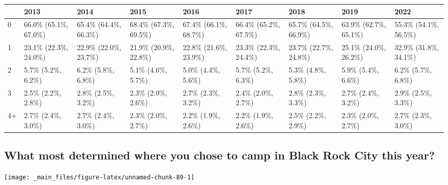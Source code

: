 \documentclass[
]{book}
\begin{document}
\begin{table}
\centering
\begin{tabular}[t]{>{}l|>{}l|>{}l|>{}l|>{}l|>{}l|>{}l|>{}l|>{}l}
\hline
  & 2013 & 2014 & 2015 & 2016 & 2017 & 2018 & 2019 & 2022\\
\hline
0 & 66.0\% (65.1\%, 67.0\%) & 65.4\% (64.4\%, 66.3\%) & 68.4\% (67.3\%, 69.5\%) & 67.4\% (66.1\%, 68.7\%) & 66.4\% (65.2\%, 67.5\%) & 65.7\% (64.5\%, 66.9\%) & 63.9\% (62.7\%, 65.1\%) & 55.3\% (54.1\%, 56.5\%)\\
\hline
1 & 23.1\% (22.3\%, 24.0\%) & 22.9\% (22.0\%, 23.7\%) & 21.9\% (20.9\%, 22.8\%) & 22.8\% (21.6\%, 23.9\%) & 23.3\% (22.3\%, 24.4\%) & 23.7\% (22.7\%, 24.8\%) & 25.1\% (24.0\%, 26.2\%) & 32.9\% (31.8\%, 34.1\%)\\
\hline
2 & 5.7\% (5.2\%, 6.2\%) & 6.2\% (5.8\%, 6.8\%) & 5.1\% (4.6\%, 5.7\%) & 5.0\% (4.4\%, 5.6\%) & 5.7\% (5.2\%, 6.3\%) & 5.3\% (4.8\%, 5.8\%) & 5.9\% (5.4\%, 6.6\%) & 6.2\% (5.7\%, 6.8\%)\\
\hline
3 & 2.5\% (2.2\%, 2.8\%) & 2.8\% (2.5\%, 3.2\%) & 2.3\% (2.0\%, 2.6\%) & 2.7\% (2.3\%, 3.2\%) & 2.4\% (2.0\%, 2.7\%) & 2.8\% (2.3\%, 3.3\%) & 2.7\% (2.4\%, 3.2\%) & 2.9\% (2.5\%, 3.3\%)\\
\hline
4+ & 2.7\% (2.4\%, 3.0\%) & 2.7\% (2.4\%, 3.0\%) & 2.3\% (2.0\%, 2.7\%) & 2.2\% (1.9\%, 2.6\%) & 2.2\% (1.9\%, 2.6\%) & 2.5\% (2.2\%, 2.9\%) & 2.3\% (2.0\%, 2.7\%) & 2.7\% (2.3\%, 3.0\%)\\
\hline
\end{tabular}
\end{table}

\hypertarget{what-most-determined-where-you-chose-to-camp-in-black-rock-city-this-year}{%
\subsection{What most determined where you chose to camp in Black Rock City this year?}\label{what-most-determined-where-you-chose-to-camp-in-black-rock-city-this-year}}

\texttt{[image: \_main\_files/figure-latex/unnamed-chunk-89-1]}
\end{document}
